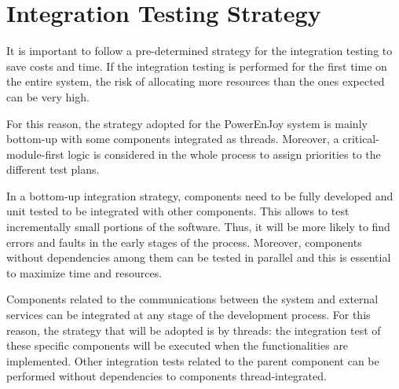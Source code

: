 
\section{Integration Testing Strategy}
It is important to follow a pre-determined strategy for the integration testing to save costs and time. If the integration testing is performed for the first time on the entire system, the risk of allocating more resources than the ones expected can be very high.

For this reason, the strategy adopted for the PowerEnJoy system is mainly bottom-up with some components integrated as threads. Moreover, a critical-module-first logic is considered in the whole process to assign priorities to the different test plans.

In a bottom-up integration strategy, components need to be fully developed and unit tested to be integrated with other components. This allows to test incrementally small portions of the software. Thus, it will be more likely to find errors and faults in the early stages of the process. Moreover, components without dependencies among them can be tested in parallel and this is essential to maximize time and resources.

Components related to the communications between the system and external services can be integrated at any stage of the development process. For this reason, the strategy that will be adopted is by threads: the integration test of these specific components will be executed when the functionalities are implemented. Other integration tests related to the parent component can be performed without dependencies to components thread-integrated.
